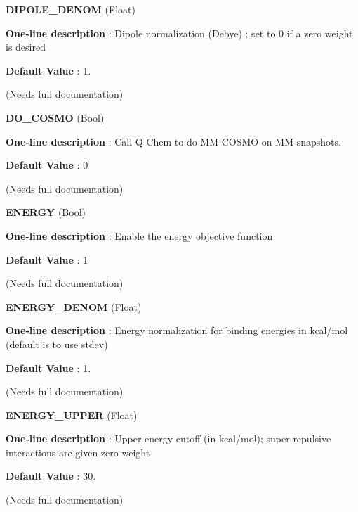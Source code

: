 \begin{DoxyItemize}
\item {\bfseries  D\-I\-P\-O\-L\-E\-\_\-\-D\-E\-N\-O\-M } (Float) \par
{\bfseries  One-\/line description }\-: Dipole normalization (Debye) ; set to 0 if a zero weight is desired \par
{\bfseries  Default Value }\-: 1. \par
(Needs full documentation)\end{DoxyItemize}
\begin{DoxyItemize}
\item {\bfseries  D\-O\-\_\-\-C\-O\-S\-M\-O } (Bool) \par
{\bfseries  One-\/line description }\-: Call Q-\/\-Chem to do M\-M C\-O\-S\-M\-O on M\-M snapshots. \par
{\bfseries  Default Value }\-: 0 \par
(Needs full documentation)\end{DoxyItemize}
\begin{DoxyItemize}
\item {\bfseries  E\-N\-E\-R\-G\-Y } (Bool) \par
{\bfseries  One-\/line description }\-: Enable the energy objective function \par
{\bfseries  Default Value }\-: 1 \par
(Needs full documentation)\end{DoxyItemize}
\begin{DoxyItemize}
\item {\bfseries  E\-N\-E\-R\-G\-Y\-\_\-\-D\-E\-N\-O\-M } (Float) \par
{\bfseries  One-\/line description }\-: Energy normalization for binding energies in kcal/mol (default is to use stdev) \par
{\bfseries  Default Value }\-: 1. \par
(Needs full documentation)\end{DoxyItemize}
\begin{DoxyItemize}
\item {\bfseries  E\-N\-E\-R\-G\-Y\-\_\-\-U\-P\-P\-E\-R } (Float) \par
{\bfseries  One-\/line description }\-: Upper energy cutoff (in kcal/mol); super-\/repulsive interactions are given zero weight \par
{\bfseries  Default Value }\-: 30. \par
(Needs full documentation)\end{DoxyItemize}
